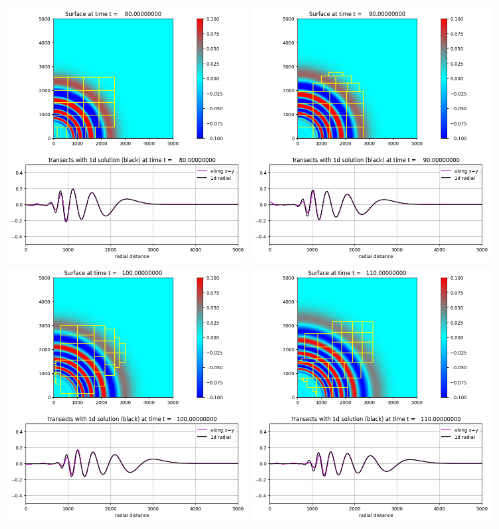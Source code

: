\documentclass[11pt]{article}
\begin{document}
\vskip 10pt 
\includegraphics[width=0.475\textwidth]{frame0008fig20.png}
\vskip 10pt 
\includegraphics[width=0.475\textwidth]{frame0009fig20.png}
\vskip 10pt 
\includegraphics[width=0.475\textwidth]{frame0010fig20.png}
\vskip 10pt 
\includegraphics[width=0.475\textwidth]{frame0011fig20.png}
\end{document}
